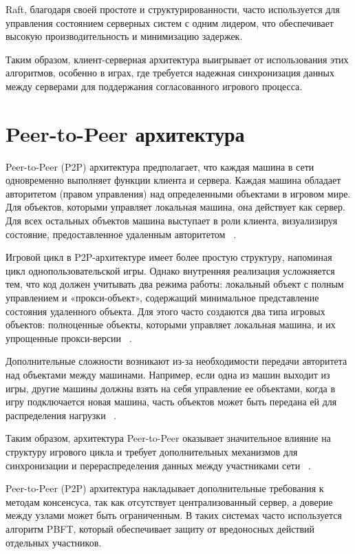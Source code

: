Raft, благодаря своей простоте и структурированности, часто используется для управления состоянием серверных систем с одним лидером, что обеспечивает высокую производительность и минимизацию задержек.

Таким образом, клиент-серверная архитектура выигрывает от использования этих алгоритмов, особенно в играх, где требуется надежная синхронизация данных между серверами для поддержания согласованного игрового процесса.

\section{Peer-to-Peer архитектура}
Peer-to-Peer (P2P) архитектура предполагает, что каждая машина в сети одновременно выполняет функции клиента и сервера. Каждая машина обладает авторитетом (правом управления) над определенными объектами в игровом мире. Для объектов, которыми управляет локальная машина, она действует как сервер. Для всех остальных объектов машина выступает в роли клиента, визуализируя состояние, предоставленное удаленным авторитетом ~\cite{b4}.

Игровой цикл в P2P-архитектуре имеет более простую структуру, напоминая цикл однопользовательской игры. Однако внутренняя реализация усложняется тем, что код должен учитывать два режима работы: локальный объект с полным управлением и «прокси-объект», содержащий минимальное представление состояния удаленного объекта. Для этого часто создаются два типа игровых объектов: полноценные объекты, которыми управляет локальная машина, и их упрощенные прокси-версии ~\cite{b4}.

Дополнительные сложности возникают из-за необходимости передачи авторитета над объектами между машинами. Например, если одна из машин выходит из игры, другие машины должны взять на себя управление ее объектами, когда в игру подключается новая машина, часть объектов может быть передана ей для распределения нагрузки ~\cite{b4}.

Таким образом, архитектура Peer-to-Peer оказывает значительное влияние на структуру игрового цикла и требует дополнительных механизмов для синхронизации и перераспределения данных между участниками сети ~\cite{b4}.

Peer-to-Peer (P2P) архитектура накладывает дополнительные требования к методам консенсуса, так как отсутствует централизованный сервер, а доверие между узлами может быть ограниченным. В таких системах часто используется алгоритм PBFT, который обеспечивает защиту от вредоносных действий отдельных участников. 

